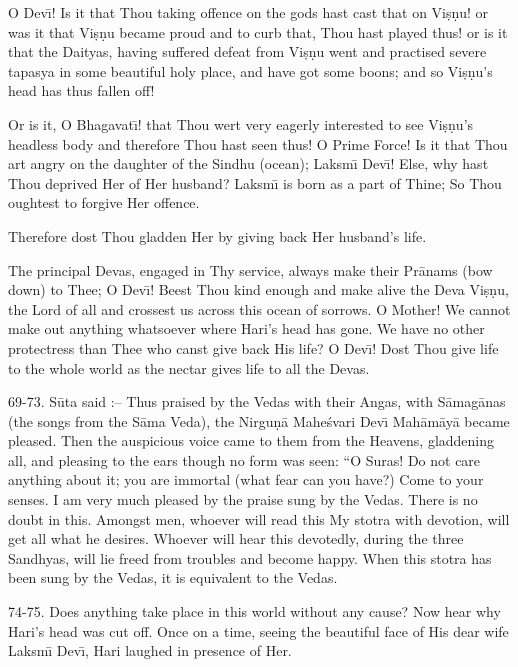 O Dev\={\i}! Is it that Thou taking offence on the gods hast cast that on Vi\d{s}\d{n}u! or was it that Vi\d{s}\d{n}u became proud and to curb that, Thou hast played thus! or is it that the Daityas, having suffered defeat from Vi\d{s}\d{n}u went and practised severe tapasya in some beautiful holy place, and have got some boons; and so Vi\d{s}\d{n}u's head has thus fallen off!

Or is it, O Bhagavat\={\i}! that Thou wert very eagerly interested to see Vi\d{s}\d{n}u's headless body and therefore Thou hast seen thus! O Prime Force! Is it that Thou art angry on the daughter of the Sindhu (ocean); Laksm\={\i} Dev\={\i}! Else, why hast Thou deprived Her of Her husband? Laksm\={\i} is born as a part of Thine; So Thou oughtest to forgive Her offence.

Therefore dost Thou gladden Her by giving back Her husband's life.

The principal Devas, engaged in Thy service, always make their Pr\=anams (bow down) to Thee; O Dev\={\i}! Beest Thou kind enough and make alive the Deva Vi\d{s}\d{n}u, the Lord of all and crossest us across this ocean of sorrows. O Mother! We cannot make out anything whatsoever where Hari's head has gone. We have no other protectress than Thee who canst give back His life? O Dev\={\i}! Dost Thou give life to the whole world as the nectar gives life to all the Devas.

69-73. S\=uta said :-- Thus praised by the Vedas with their Angas, with S\=amag\=anas (the songs from the S\=ama Veda), the Nirgu\d{n}\=a Mahe\'svari Dev\={\i} Mah\=am\=ay\=a became pleased. Then the auspicious voice came to them from the Heavens, gladdening all, and pleasing to the ears though no form was seen: ``O Suras! Do not care anything about it; you are immortal (what fear can you have?) Come to your senses. I am very much pleased by the praise sung by the Vedas. There is no doubt in this. Amongst men, whoever will read this My stotra with devotion, will get all what he desires. Whoever will hear this devotedly, during the three Sandhyas, will lie freed from troubles and become happy. When this stotra has been sung by the Vedas, it is equivalent to the Vedas.

74-75. Does anything take place in this world without any cause? Now hear why Hari's head was cut off. Once on a time, seeing the beautiful face of His dear wife Laksm\={\i} Dev\={\i}, Hari laughed in presence of Her.

